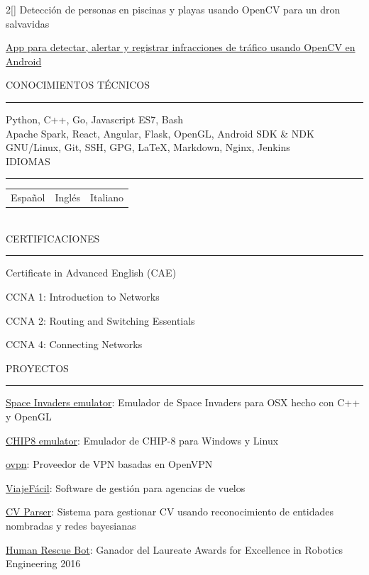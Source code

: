 \documentclass[a4paper, 12pt]{article}
\newenvironment{myparacol}[2][]{%
\begin{paracol}{#2}[#1]\setlength{\parindent}{0pt}}{%
\end{paracol}}
\begin{document}
\begin{sloppypar}
\begin{myparacol}{2}
    Detección de personas en piscinas y playas usando OpenCV para un dron salvavidas

    \href{https://github.com/hugo19941994/infrac-coche}{App para detectar, alertar y registrar infracciones de tráfico usando OpenCV en Android}
    \\

    \switchcolumn{}

    CONOCIMIENTOS TÉCNICOS
    \vspace{1mm}
    \hrule
    \kern9pt

    Python, C++, Go, Javascript ES7, Bash\\

    Apache Spark, React, Angular, Flask, OpenGL, Android SDK \& NDK\\

    GNU/Linux, Git, SSH, GPG, \LaTeX, Markdown, Nginx, Jenkins\\

    IDIOMAS
    \vspace{1mm}
    \hrule
    \kern9pt
    \noindent\begin{tabularx}{\columnwidth}{@{} X X X}
        Español & Inglés & Italiano
    \end{tabularx}
    \\

    CERTIFICACIONES
    \vspace{1mm}
    \hrule
    \kern9pt
    Certificate in Advanced English (CAE)

    CCNA 1: Introduction to Networks

    CCNA 2: Routing and Switching Essentials

    CCNA 4: Connecting Networks

    \switchcolumn{}

    \noindent PROYECTOS
    \vspace{1mm}
    \hrule
    \kern9pt
    \href{https://github.com/hugo19941994/space-invaders-emu}{Space Invaders emulator}: Emulador de Space Invaders para OSX hecho con C++ y OpenGL

    \href{https://github.com/hugo19941994/chip8-emu}{CHIP8 emulator}: Emulador de CHIP-8 para Windows y Linux

    \href{https://vpn.hugofs.com}{ovpn}: Proveedor de VPN basadas en OpenVPN

    \href{https://github.com/hugo19941994/ViajeFacil}{ViajeFácil}: Software de gestión para agencias de vuelos

    \href{https://github.com/hugo19941994/cv-parser}{CV Parser}: Sistema para gestionar CV usando reconocimiento de entidades nombradas y redes bayesianas

    \href{https://github.com/hugo19941994/robot}{Human Rescue Bot}: Ganador del Laureate Awards for Excellence in Robotics Engineering 2016

\end{myparacol}
\end{sloppypar}
\end{document}
